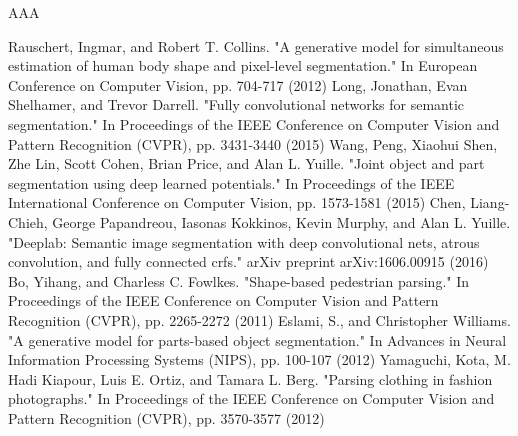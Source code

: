 \begin{acknowledgements}
AAA
\end{acknowledgements}


\begin{thebibliography}{}
%
%
%
Rauschert, Ingmar, and Robert T. Collins. "A generative model for simultaneous estimation of human body shape and pixel-level segmentation." In European Conference on Computer Vision, pp. 704-717 (2012)
Long, Jonathan, Evan Shelhamer, and Trevor Darrell. "Fully convolutional networks for semantic segmentation." In Proceedings of the IEEE Conference on Computer Vision and Pattern Recognition (CVPR), pp. 3431-3440 (2015)
Wang, Peng, Xiaohui Shen, Zhe Lin, Scott Cohen, Brian Price, and Alan L. Yuille. "Joint object and part segmentation using deep learned potentials." In Proceedings of the IEEE International Conference on Computer Vision, pp. 1573-1581 (2015)
Chen, Liang-Chieh, George Papandreou, Iasonas Kokkinos, Kevin Murphy, and Alan L. Yuille. "Deeplab: Semantic image segmentation with deep convolutional nets, atrous convolution, and fully connected crfs." arXiv preprint arXiv:1606.00915 (2016)
Bo, Yihang, and Charless C. Fowlkes. "Shape-based pedestrian parsing." In Proceedings of the IEEE Conference on Computer Vision and Pattern Recognition (CVPR), pp. 2265-2272 (2011)
Eslami, S., and Christopher Williams. "A generative model for parts-based object segmentation." In Advances in Neural Information Processing Systems (NIPS), pp. 100-107 (2012)
Yamaguchi, Kota, M. Hadi Kiapour, Luis E. Ortiz, and Tamara L. Berg. "Parsing clothing in fashion photographs." In Proceedings of the IEEE Conference on Computer Vision and Pattern Recognition (CVPR), pp. 3570-3577 (2012)

\end{thebibliography}
